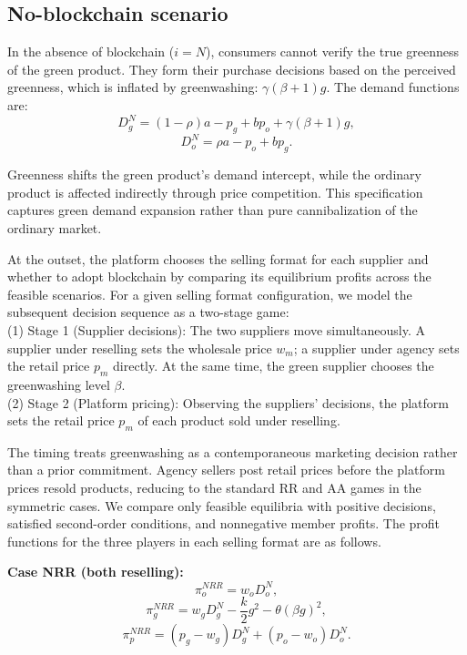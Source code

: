 \documentclass[preprint,review,12pt,authoryear,nopreprintline]{elsarticle}
\theoremstyle{definition}
\begin{document}
\subsection{No-blockchain scenario}

In the absence of blockchain ($i = N$), consumers cannot verify the true greenness of the green product. They form their purchase decisions based on the perceived greenness, which is inflated by greenwashing: $\gamma(\beta + 1)g$. The demand functions are:
\begin{equation}
D_g^{N}=(1-\rho)a-p_g+bp_o+\gamma(\beta+1)g,
\end{equation}
\begin{equation}
D_o^{N}=\rho a-p_o+bp_g.
\end{equation}

Greenness shifts the green product's demand intercept, while the ordinary product is affected indirectly through price competition. This specification captures green demand expansion rather than pure cannibalization of the ordinary market.

At the outset, the platform chooses the selling format for each supplier and whether to adopt blockchain by comparing its equilibrium profits across the feasible scenarios. For a given selling format configuration, we model the subsequent decision sequence as a two-stage game: \\
(1) Stage 1 (Supplier decisions): The two suppliers move simultaneously. A supplier under reselling sets the wholesale price $w_m$; a supplier under agency sets the retail price $p_m$ directly. At the same time, the green supplier chooses the greenwashing level $\beta$. \\
(2) Stage 2 (Platform pricing): Observing the suppliers' decisions, the platform sets the retail price $p_m$ of each product sold under reselling.

The timing treats greenwashing as a contemporaneous marketing decision rather than a prior commitment. Agency sellers post retail prices before the platform prices resold products, reducing to the standard RR and AA games in the symmetric cases. We compare only feasible equilibria with positive decisions, satisfied second-order conditions, and nonnegative member profits. The profit functions for the three players in each selling format are as follows.

\noindent\textbf{Case NRR (both reselling):}
\begin{equation} \label{eq:profit-RR}
\pi_o^{NRR}=w_oD_o^N,
\end{equation}
\begin{equation}
\pi_g^{NRR}=w_g D_g^N-\frac{k}{2}g^2-\theta (\beta g)^2,
\end{equation}
\begin{equation}
\pi_p^{NRR}=(p_g-w_g)D_g^N+(p_o-w_o)D_o^N.
\end{equation}
\end{document}
